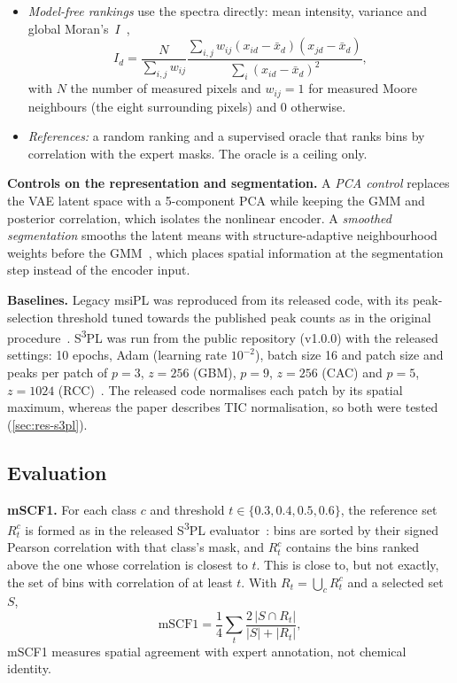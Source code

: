 \begin{itemize}
        score zero. It needs no gradients; this is the segment-then-correlate
        approach~\citep{alexandrov2010spatial}.
  \item \emph{Model-free rankings} use the spectra directly: mean intensity,
        variance and global Moran's~$I$~\citep{moran1950notes},
        \begin{equation}
        I_d=\frac{N}{\sum_{i,j}w_{ij}}
        \frac{\sum_{i,j}w_{ij}(x_{id}-\bar{x}_d)(x_{jd}-\bar{x}_d)}
        {\sum_i(x_{id}-\bar{x}_d)^2},
        \end{equation}
        with $N$ the number of measured pixels and $w_{ij}=1$ for measured Moore
        neighbours (the eight surrounding pixels) and 0 otherwise.
  \item \emph{References:} a random ranking and a supervised oracle that ranks
        bins by correlation with the expert masks. The oracle is a ceiling only.
\end{itemize}

\textbf{Controls on the representation and segmentation.} A \emph{PCA control}
replaces the VAE latent space with a 5-component PCA while keeping the GMM and
posterior correlation, which isolates the nonlinear encoder. A \emph{smoothed
segmentation} smooths the latent means with structure-adaptive neighbourhood
weights before the GMM~\citep{alexandrov2011efficient}, which places spatial
information at the segmentation step instead of the encoder input.

\textbf{Baselines.} Legacy msiPL was reproduced from its released code, with
its peak-selection threshold tuned towards the published peak counts as in the
original procedure~\citep{abdelmoula2021peak}. S\textsuperscript{3}PL was run
from the public repository (v1.0.0) with the released settings: 10 epochs,
Adam (learning rate $10^{-2}$), batch size 16 and patch size and peaks per
patch of $p=3$, $z=256$ (GBM), $p=9$, $z=256$ (CAC) and $p=5$, $z=1024$
(RCC)~\citep{weigand2026spatial}. The released code normalises each patch by
its spatial maximum, whereas the paper describes TIC normalisation, so both
were tested (\cref{sec:res-s3pl}).

\subsection{Evaluation}
\label{sec:evaluation}
\textbf{mSCF1.} For each class $c$ and threshold $t\in\{0.3,0.4,0.5,0.6\}$,
the reference set $R^c_t$ is formed as in the released
S\textsuperscript{3}PL evaluator~\citep{weigand2026spatial}: bins are sorted by
their signed Pearson correlation with that class's mask, and $R^c_t$ contains
the bins ranked above the one whose correlation is closest to $t$. This is
close to, but not exactly, the set of bins with correlation of at least $t$. With $R_t=\bigcup_c R^c_t$ and a
selected set $S$,
\begin{equation}
\mathrm{mSCF1}=\frac{1}{4}\sum_{t}\frac{2\,|S\cap R_t|}{|S|+|R_t|},
\end{equation}
mSCF1 measures spatial agreement with expert annotation, not chemical
identity.

